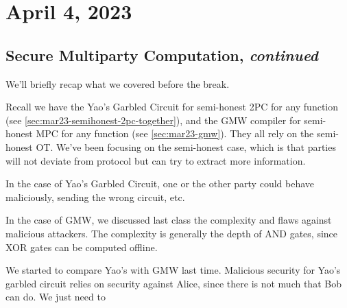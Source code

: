 \section{April 4, 2023}
\label{20230404}
\subsection{Secure Multiparty Computation, \emph{continued}}
We'll briefly recap what we covered before the break.

Recall we have the Yao's Garbled Circuit for semi-honest 2PC for any function (see \cref{sec:mar23-semihonest-2pc-together}), and the GMW compiler for semi-honest MPC for any function (see \cref{sec:mar23-gmw}). They all rely on the semi-honest OT. We've been focusing on the semi-honest case, which is that parties will not deviate from protocol but can try to extract more information.

In the case of Yao's Garbled Circuit, one or the other party could behave maliciously, sending the wrong circuit, etc.

In the case of GMW, we discussed last class the complexity and flaws against malicious attackers. The complexity is generally the depth of \textsf{AND} gates, since \textsf{XOR} gates can be computed offline.

We started to compare Yao's with GMW last time. Malicious security for Yao's garbled circuit relies on security against Alice, since there is not much that Bob can do. We just need to
